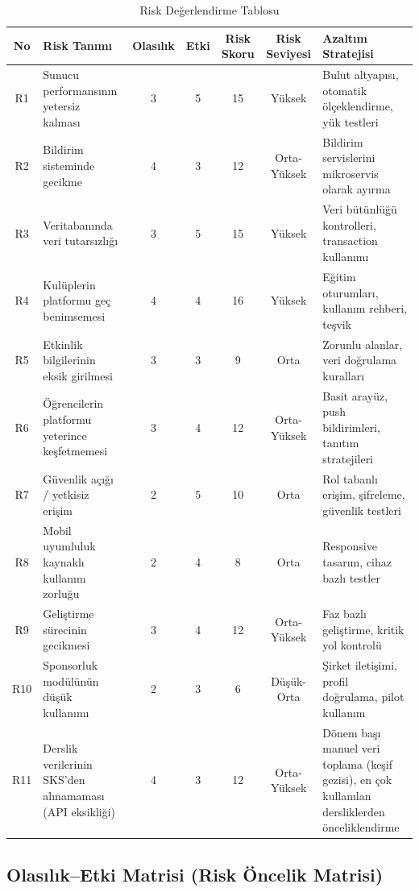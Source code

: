 \documentclass[a4paper,12pt]{report}
\begin{document}
\begin{table}[H]
\centering
\caption{Risk Değerlendirme Tablosu}
\begin{tabular}{c p{5.2cm} c c c c p{4.5cm}}
\toprule
\textbf{No} & \textbf{Risk Tanımı} & \textbf{Olasılık} & \textbf{Etki} & \textbf{Risk Skoru} & \textbf{Risk Seviyesi} & \textbf{Azaltım Stratejisi} \\
\midrule
R1 & Sunucu performansının yetersiz kalması & 3 & 5 & 15 & Yüksek & Bulut altyapısı, otomatik ölçeklendirme, yük testleri \\
R2 & Bildirim sisteminde gecikme & 4 & 3 & 12 & Orta-Yüksek & Bildirim servislerini mikroservis olarak ayırma \\
R3 & Veritabanında veri tutarsızlığı & 3 & 5 & 15 & Yüksek & Veri bütünlüğü kontrolleri, transaction kullanımı \\
R4 & Kulüplerin platformu geç benimsemesi & 4 & 4 & 16 & Yüksek & Eğitim oturumları, kullanım rehberi, teşvik \\
R5 & Etkinlik bilgilerinin eksik girilmesi & 3 & 3 & 9 & Orta & Zorunlu alanlar, veri doğrulama kuralları \\
R6 & Öğrencilerin platformu yeterince keşfetmemesi & 3 & 4 & 12 & Orta-Yüksek & Basit arayüz, push bildirimleri, tanıtım stratejileri \\
R7 & Güvenlik açığı / yetkisiz erişim & 2 & 5 & 10 & Orta & Rol tabanlı erişim, şifreleme, güvenlik testleri \\
R8 & Mobil uyumluluk kaynaklı kullanım zorluğu & 2 & 4 & 8 & Orta & Responsive tasarım, cihaz bazlı testler \\
R9 & Geliştirme sürecinin gecikmesi & 3 & 4 & 12 & Orta-Yüksek & Faz bazlı geliştirme, kritik yol kontrolü \\
R10 & Sponsorluk modülünün düşük kullanımı & 2 & 3 & 6 & Düşük-Orta & Şirket iletişimi, profil doğrulama, pilot kullanım \\
R11 & Derslik verilerinin SKS'den alınamaması (API eksikliği) & 4 & 3 & 12 & Orta-Yüksek & Dönem başı manuel veri toplama (keşif gezisi), en çok kullanılan dersliklerden önceliklendirme \\
\bottomrule
\end{tabular}
\end{table}

\subsection{Olasılık–Etki Matrisi (Risk Öncelik Matrisi)}
\end{document}
